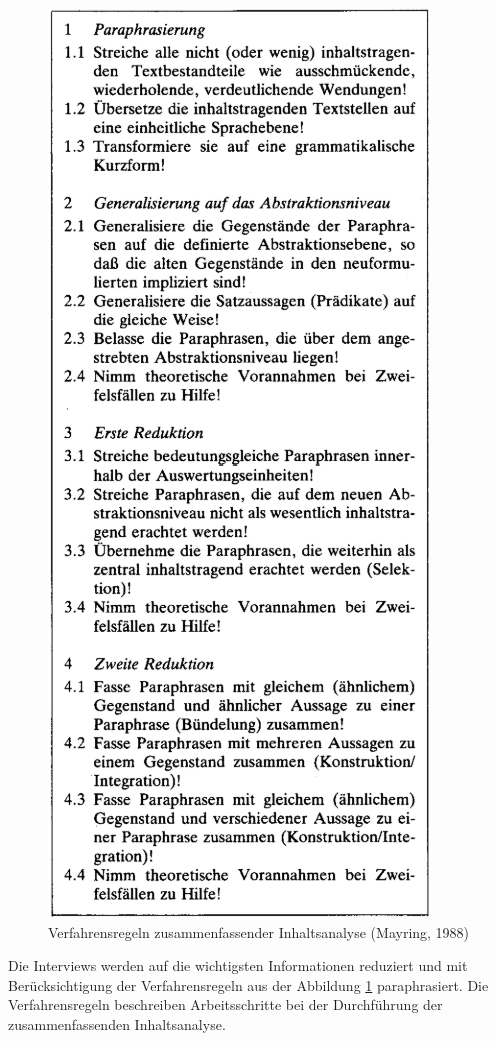 \begin{figure}[H]
\begin{minipage}[b]{.4\linewidth}
		\includegraphics[scale=1]{Abbildungen/verfahrensregeln.png}
		\caption{Verfahrensregeln zusammenfassender Inhaltsanalyse (Mayring, 1988) \cite{mayring2019qualitative}}
		\label{fig:verfahrensregeln}
	\end{minipage}
\end{figure}
Die Interviews werden auf die wichtigsten Informationen reduziert und mit Berücksichtigung der Verfahrensregeln aus der Abbildung \ref{fig:verfahrensregeln} paraphrasiert. Die Verfahrensregeln beschreiben Arbeitsschritte bei der Durchführung der zusammenfassenden Inhaltsanalyse.
